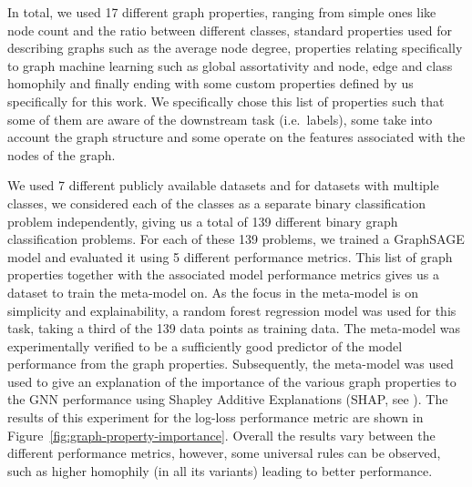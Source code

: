 In total, we used 17 different graph properties, ranging from simple ones like node count and the ratio between different classes, standard properties used for describing graphs such as the average node degree, properties relating specifically to graph machine learning such as global assortativity and node, edge and class homophily and finally ending with some custom properties defined by us specifically for this work. We specifically chose this list of properties such that some of them are aware of the downstream task (i.e.\ labels), some take into account the graph structure and some operate on the features associated with the nodes of the graph.

We used 7 different publicly available datasets and for datasets with multiple classes, we considered each of the classes as a separate binary classification problem independently, giving us a total of 139 different binary graph classification problems. For each of these 139 problems, we trained a GraphSAGE model and evaluated it using 5 different performance metrics. This list of graph properties together with the associated model performance metrics gives us a dataset to train the meta-model on. As the focus in the meta-model is on simplicity and explainability, a random forest regression model was used for this task, taking a third of the 139 data points as training data. The meta-model was experimentally verified to be a sufficiently good predictor of the model performance from the graph properties. Subsequently, the meta-model was used used to give an explanation of the importance of the various graph properties to the GNN performance using Shapley Additive Explanations (SHAP, see \cite{shapley_notes_1951}). The results of this experiment for the log-loss performance metric are shown in Figure~\ref{fig:graph-property-importance}. Overall the results vary between the different performance metrics, however, some universal rules can be observed, such as higher homophily (in all its variants) leading to better performance.

